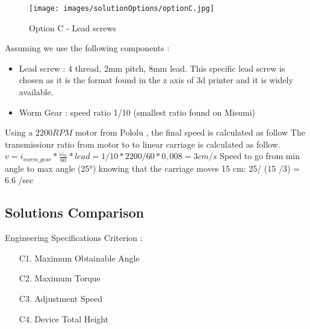 \documentclass[lettersize,journal]{IEEEtran}
\begin{document}
\begin{figure}[!ht]
    \centering
    \texttt{[image: images/solutionOptions/optionC.jpg]}
    \caption{Option C - Lead screws}
    \label{optionC}
\end{figure}

Assuming we use the following components : 
\begin{itemize}
    \item Lead screw : 4 thread, 2mm pitch, 8mm lead. This specific lead screw is chosen as it is the format found in the z axis of 3d printer and it is widely available.
    \item Worm Gear : speed ratio 1/10 (smallest ratio found on Misumi)    
\end{itemize}


Using a $2200 RPM$ motor from Pololu \cite{pololu}, the final speed is calculated as follow
The transmissionr ratio from motor to to linear carriage is calculated as follow. 
$v = i_{worm\_gear} * \frac{\omega_m}{60} * lead = 1/10 * 2200/60 * 0,008 = 3cm/s$
Speed to go from min angle to max angle (25°) knowing that the carriage moves 15 cm: 25/ (15 /3) = 6.6 \degree/sec






\subsection{Solutions Comparison}

\renewcommand{\arraystretch}{1.5}

Engineering Specifications Criterion :
\begin{enumerate}
    \item[C1.] Maximum Obtainable Angle 

    \item[C2.] Maximum Torque 

    \item[C3.] Adjustment Speed

    \item[C4.] Device Total Height
\end{enumerate}
\end{document}
